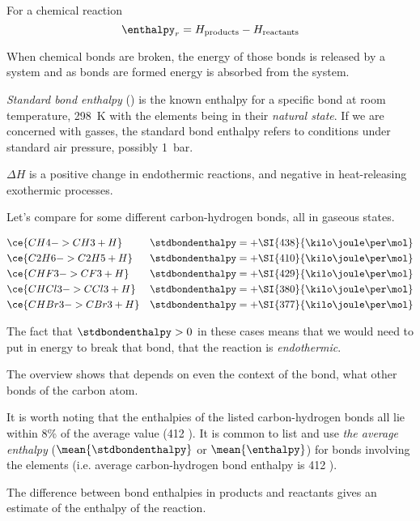 \documentclass[../mit-general-chemistry.tex]{subfiles}
\begin{document}
For a chemical reaction
\begin{equation*}
  \enthalpy_r = H_{\text{products}} - H_{\text{reactants}}
\end{equation*}


When chemical bonds are broken, the energy of those bonds is released
by a system and as bonds are formed energy is absorbed from the
system.

{\em Standard bond enthalpy} (\stdbondenthalpy) is the known enthalpy
for a specific bond at room temperature, \SI{298}{\kelvin} with the
elements being in their {\em natural state}. If we are concerned with
gasses, the standard bond enthalpy refers to conditions under standard
air pressure, possibly \SI{1}{\bar}.

$\Delta H$ is a positive change in endothermic reactions, and negative
in heat-releasing exothermic processes.




Let's compare \stdbondenthalpy for some different carbon-hydrogen
bonds, all in gaseous states.

\begin{align*}
  &\ce{CH4 -> CH3 + H} &\stdbondenthalpy = + \SI{438}{\kilo\joule\per\mol} \\
  &\ce{C2H6 -> C2H5 + H} &\stdbondenthalpy = + \SI{410}{\kilo\joule\per\mol} \\
  &\ce{CHF3 -> CF3 + H} &\stdbondenthalpy = + \SI{429}{\kilo\joule\per\mol} \\
  &\ce{CHCl3 -> CCl3 + H} &\stdbondenthalpy = + \SI{380}{\kilo\joule\per\mol} \\
  &\ce{CHBr3 -> CBr3 + H} &\stdbondenthalpy = + \SI{377}{\kilo\joule\per\mol} \\
\end{align*}

The fact that $\stdbondenthalpy > 0$ in these cases means that we
would need to put in energy to break that bond, that the reaction is
{\em endothermic}.

The overview shows that \stdbondenthalpy depends on even the context
of the bond, what other bonds of the carbon atom.

It is worth noting that the enthalpies of the listed carbon-hydrogen
bonds all lie within 8\% of the average value (412 \kjpm). It is
common to list and use {\em the average enthalpy}
($\mean{\stdbondenthalpy}$ or $\mean{\enthalpy}$) for bonds involving
the elements (i.e. average carbon-hydrogen bond enthalpy is 412
\kjpm).

The difference between bond enthalpies in products and reactants gives
an estimate of the enthalpy of the reaction.
\end{document}
